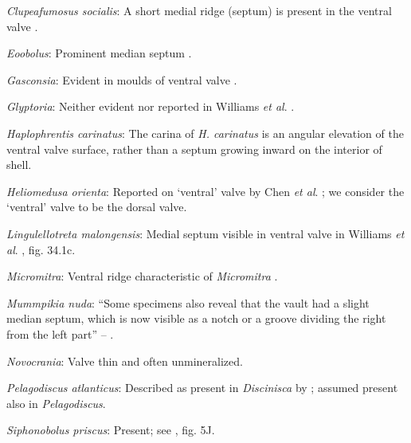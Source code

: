\documentclass[openany]{book}
\begin{document}
\hypertarget{Clupeafumosus_socialis-coding-122}{}
\emph{Clupeafumosus socialis}: A short medial ridge (septum) is present
in the ventral valve \citep{Topper2013Reappraisalof}.

\hypertarget{Eoobolus-coding-122}{}
\emph{Eoobolus}: Prominent median septum \citep[fig. 4d, e
in][]{Balthasar2009Thebrachiopod}.

\hypertarget{Gasconsia-coding-122}{}
\emph{Gasconsia}: Evident in moulds of ventral valve
\citep{Hanken1985Thetaxonomy, Watkins2002Newrecord}.

\hypertarget{Glyptoria-coding-122}{}
\emph{Glyptoria}: Neither evident nor reported in Williams \emph{et al}.
\citeyearpar{Williams2000LinguliformeaCraniiformea}.

\hypertarget{Haplophrentis_carinatus-coding-122}{}
\emph{Haplophrentis carinatus}: The carina of \emph{H. carinatus} is an
angular elevation of the ventral valve surface, rather than a septum
growing inward on the interior of shell.

\hypertarget{Heliomedusa_orienta-coding-122}{}
\emph{Heliomedusa orienta}: Reported on `ventral' valve by Chen \emph{et
al}. \citeyearpar{Chen2007Reinterpretationof}; we consider the `ventral'
valve to be the dorsal valve.

\hypertarget{Lingulellotreta_malongensis-coding-122}{}
\emph{Lingulellotreta malongensis}: Medial septum visible in ventral
valve in Williams \emph{et al}.
\citeyearpar{Williams2000LinguliformeaCraniiformea}, fig. 34.1c.

\hypertarget{Micromitra-coding-122}{}
\emph{Micromitra}: Ventral ridge characteristic of \emph{Micromitra}
\citep{Skovsted2010EarlyCambrian}.

\hypertarget{Mummpikia_nuda-coding-122}{}
\emph{Mummpikia nuda}: ``Some specimens also reveal that the vault had a
slight median septum, which is now visible as a notch or a groove
dividing the right from the left part'' --
\citet{Balthasar2008iMummpikia}.

\hypertarget{Novocrania-coding-122}{}
\emph{Novocrania}: Valve thin and often unmineralized.

\hypertarget{Pelagodiscus_atlanticus-coding-122}{}
\emph{Pelagodiscus atlanticus}: Described as present in
\emph{Discinisca} by \citet{Chen2007Reinterpretationof}; assumed present
also in \emph{Pelagodiscus}.

\hypertarget{Siphonobolus_priscus-coding-122}{}
\emph{Siphonobolus priscus}: Present; see
\citet{Popov2009Earlyontogeny}, fig. 5J.
\end{document}
